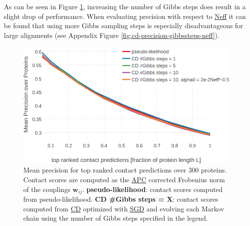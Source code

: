 \documentclass[11pt,a4paper,twoside]{book}
\newcommand{\wij}{\mathbf{w}_{ij}}
\theoremstyle{definition}
\theoremstyle{definition}
\theoremstyle{remark}
\begin{document}
As can be seen in Figure \ref{fig:precision-cd-gibbs-steps}, increasing
the number of Gibbs steps does result in a slight drop of performance.
When evaluating precision with respect to
\protect\hyperlink{abbrev}{Neff} it can be found that using more Gibbs
sampling steps is especially disadvantageous for large alignments (see
Appendix Figure \ref{fig:cd-precision-gibbssteps-neff}).










\begin{figure}

{\centering \includegraphics[width=0.9\linewidth]{img/full_likelihood/gibbs_sampling/precision_vs_rank_gibbssteps} 

}

\caption{Mean precision for top ranked
contact predictions over 300 proteins. Contact scores are computed as
the \protect\hyperlink{abbrev}{APC} corrected Frobenius norm of the
couplings \(\wij\). \textbf{pseudo-likelihood}: contact scores computed
from pseudo-likelihood. \textbf{CD \#Gibbs steps = X}: contact scores
computed from \protect\hyperlink{abbrev}{CD} optimized with
\protect\hyperlink{abbrev}{SGD} and evolving each Markov chain using the
number of Gibbs steps specified in the legend.}\label{fig:precision-cd-gibbs-steps}
\end{figure}
\end{document}
